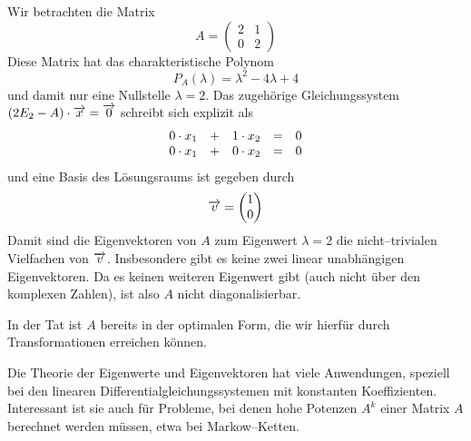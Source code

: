 \begin{beispiel} Wir betrachten die Matrix
 	$$ A =  \left( \begin{matrix} 2 & 1  \\ 
	0  & 2  \end{matrix} \right) $$
Diese Matrix hat das charakteristische Polynom
  	$$ P_A(\lambda) = \lambda^2 -4 \lambda + 4 $$
und damit nur eine Nullstelle $\lambda = 2$. Das zugehörige Gleichungssystem $\left(2 E_2 - A\right) \cdot 
\overrightarrow{x} = \overrightarrow{0}$ schreibt sich explizit als
 	 $$ \begin{array} {l c l c l} 
  	0 \cdot x_1 & + & 1 \cdot x_2 & = & 0 \\
  	0 \cdot x_1 & + & 0 \cdot x_2 & = & 0 
  	\end{array} $$
und eine Basis des Lösungsraums ist gegeben durch 
  	$$ \overrightarrow{v} = \left( \begin{matrix} 1 \\ 0 \end{matrix} \right) $$
Damit sind die Eigenvektoren von $A$ zum Eigenwert $\lambda = 2$ die nicht--trivialen Vielfachen von 
$\overrightarrow{v}$. Insbesondere gibt es keine zwei linear unabhängigen Eigenvektoren. Da es keinen 
weiteren Eigenwert gibt (auch nicht über den komplexen Zahlen), ist also $A$ nicht diagonalisierbar. 

In der Tat ist $A$ bereits in der optimalen Form, die wir hierfür durch Transformationen erreichen können.
\end{beispiel}


\bigbreak

Die Theorie der Eigenwerte und Eigenvektoren hat viele Anwendungen, speziell bei den linearen 
Differentialgleichungssystemen mit konstanten Koeffizienten. Interessant ist sie auch für Probleme, bei 
denen hohe Potenzen  $A^k$ einer Matrix $A$ berechnet werden müssen, etwa bei Markow--Ketten.

